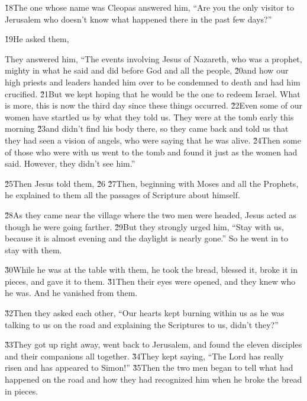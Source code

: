 \v{18}The one whose name was Cleopas answered him, ``Are you the only visitor to Jerusalem who doesn't know what happened there in the past few days?''

\v{19}He asked them, 

They answered him, ``The events involving Jesus of Nazareth, who was a prophet, mighty in what he said and did before God and all the people, \v{20}and how our high priests and leaders handed him over to be condemned to death and had him crucified. \v{21}But we kept hoping that he would be the one to redeem Israel. What is more, this is now the third day since these things occurred. \v{22}Even some of our women have startled us by what they told us. They were at the tomb early this morning \v{23}and didn't find his body there, so they came back and told us that they had seen a vision of angels, who were saying that he was alive. \v{24}Then some of those who were with us went to the tomb and found it just as the women had said. However, they didn't see him.''

\v{25}Then Jesus told them,  \v{26}  \v{27}Then, beginning with Moses and all the Prophets, he explained to them all the passages of Scripture about himself.

\v{28}As they came near the village where the two men were headed, Jesus acted as though he were going farther. \v{29}But they strongly urged him, ``Stay with us, because it is almost evening and the daylight is nearly gone.'' So he went in to stay with them.

\v{30}While he was at the table with them, he took the bread, blessed it, broke it in pieces, and gave it to them. \v{31}Then their eyes were opened, and they knew who he was. And he vanished from them.

\v{32}Then they asked each other, ``Our hearts kept burning within us as he was talking to us on the road and explaining the Scriptures to us, didn't they?''

\v{33}They got up right away, went back to Jerusalem, and found the eleven disciples and their companions all together. \v{34}They kept saying, ``The Lord has really risen and has appeared to Simon!'' \v{35}Then the two men began to tell what had happened on the road and how they had recognized him when he broke the bread in pieces.

